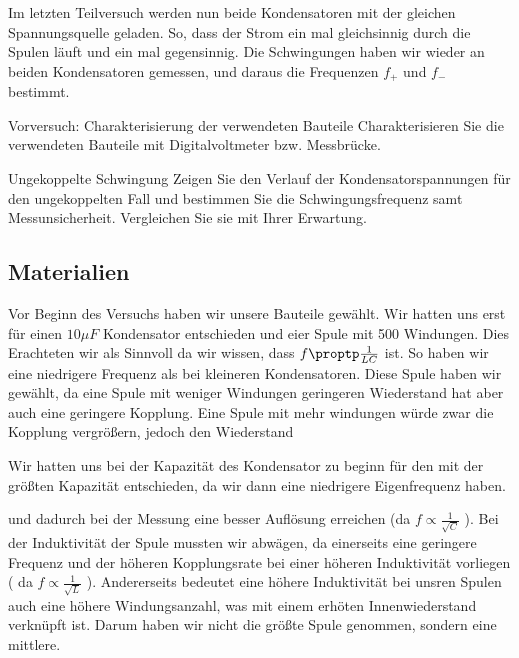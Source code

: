 \documentclass[twoside]{protokoll}
\begin{document}
Im letzten Teilversuch werden nun beide Kondensatoren mit der gleichen Spannungsquelle geladen. 
So, dass der Strom ein mal gleichsinnig durch die Spulen läuft und ein mal gegensinnig. Die Schwingungen haben wir wieder an beiden Kondensatoren gemessen, und daraus die Frequenzen $f_+$ und $f_-$ bestimmt. 
 

\begin{aufgabe}{Vorversuch: Charakterisierung der verwendeten Bauteile}
  Charakterisieren Sie die verwendeten Bauteile mit Digitalvoltmeter
  bzw. Messbrücke.
\end{aufgabe}


\begin{aufgabe}{Ungekoppelte Schwingung}
  Zeigen Sie den Verlauf der Kondensatorspannungen für den
  ungekoppelten Fall und bestimmen Sie die Schwingungsfrequenz samt
  Messunsicherheit. Vergleichen Sie sie mit Ihrer Erwartung.
\end{aufgabe}

 
\subsection{Materialien}

Vor Beginn des Versuchs haben wir unsere Bauteile gewählt. Wir hatten uns erst für einen $10\mu F$ Kondensator entschieden und eier Spule mit 500 Windungen.
Dies Erachteten wir als Sinnvoll da wir wissen, dass $ f \proptp \frac{1}{LC}$ ist. 
So haben wir eine niedrigere Frequenz als bei kleineren Kondensatoren. 
Diese Spule haben wir gewählt, da eine Spule mit weniger Windungen geringeren Wiederstand hat aber auch eine geringere Kopplung. Eine Spule mit mehr windungen würde zwar die Kopplung vergrößern, jedoch den Wiederstand  

Wir hatten uns bei der Kapazität des Kondensator zu beginn für den mit der größten Kapazität entschieden, da wir dann eine niedrigere Eigenfrequenz haben.

 und dadurch bei der Messung eine besser Auflösung erreichen (da $ f \propto \frac{1}{\sqrt{C}} $ ).
Bei der Induktivität der Spule mussten wir abwägen, da einerseits eine geringere Frequenz und der höheren Kopplungsrate bei einer höheren Induktivität vorliegen ( da $ f \propto \frac{1}{\sqrt{L}} $ ).
Andererseits bedeutet eine höhere Induktivität bei unsren Spulen auch eine höhere Windungsanzahl, was mit einem erhöten Innenwiederstand verknüpft ist.
Darum haben wir nicht die größte Spule genommen, sondern eine mittlere. \\
\end{document}
